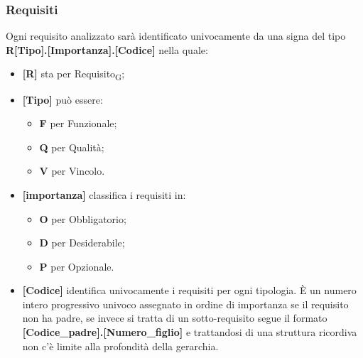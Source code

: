 \subsubsection{Requisiti}
Ogni requisito analizzato  sarà identificato univocamente da una signa del tipo \\ \textbf{R[Tipo].[Importanza].[Codice]} nella quale:
\begin{itemize}
    \item \textbf{[R]} sta per Requisito\textsubscript{G};
    \item \textbf{[Tipo]} può essere:
    \begin{itemize}
        \item \textbf{F} per Funzionale;
        \item \textbf{Q} per Qualità;
        \item \textbf{V} per Vincolo.
    \end{itemize}
    \item \textbf{[importanza]} classifica i requisiti in:
    \begin{itemize}
        \item \textbf{O} per Obbligatorio;
        \item \textbf{D} per Desiderabile;
        \item \textbf{P} per Opzionale.
    \end{itemize}
    \item \textbf{[Codice]} identifica univocamente i requisiti per ogni tipologia. È un numero intero progressivo univoco assegnato in ordine di importanza se il requisito non ha padre, se invece si tratta di un sotto-requisito segue il formato \textbf{[Codice\_padre].[Numero\_figlio]} e trattandosi di una struttura ricordiva non c'è limite alla profondità della gerarchia.
\end{itemize}

